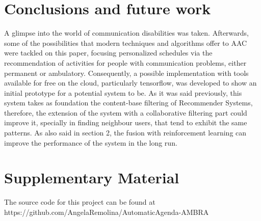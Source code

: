 \documentclass[10pt,twocolumn,letterpaper]{article}
\begin{document}
\section{Conclusions and future work} 

A glimpse into the world of communication disabilities was taken. Afterwards, some of the possibilities that modern techniques and algorithms offer to AAC were tackled on this paper, focusing personalized schedules via the recommendation of activities for people with communication problems, either permanent or ambulatory. Consequently, a possible implementation with tools available for free on the cloud, particularly tensorflow, was developed to show an initial prototype for a potential system to be. As it was said previously, this system takes as foundation the content-base filtering of Recommender Systems, therefore, the extension of the system with a collaborative filtering part could improve it, specially in finding neighbour users, that tend to exhibit the same patterns. As also said in section 2, the fusion with reinforcement learning can improve the performance of the system in the long run.

\appendix

\section{Supplementary Material} 
The source code for this project can be found at https://github.com/AngelaRemolina/AutomaticAgenda-AMBRA




{


}
\end{document}

